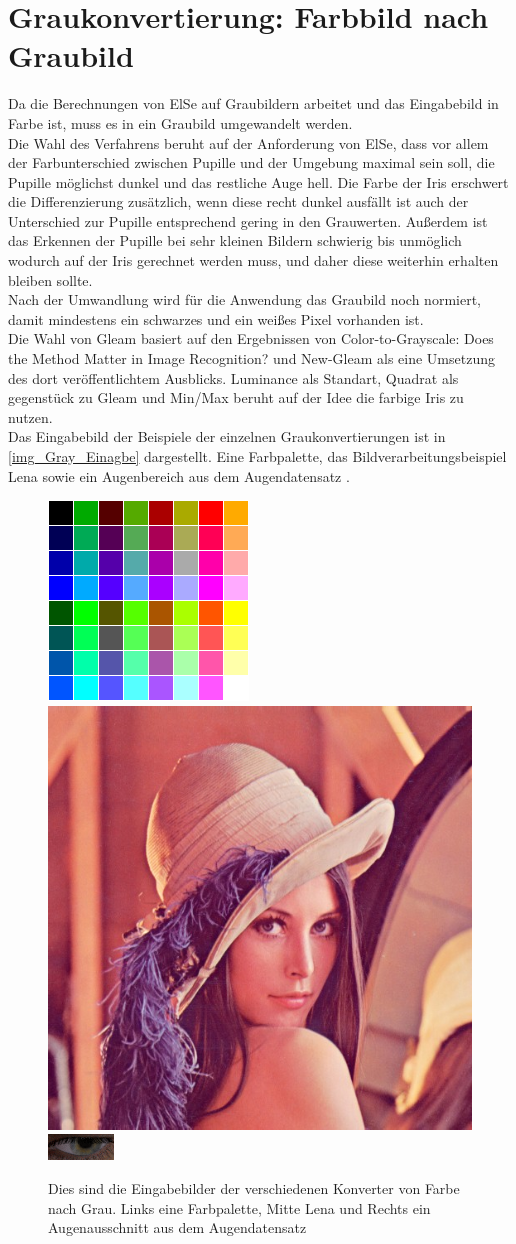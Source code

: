 \section{Graukonvertierung: Farbbild nach Graubild}
\label{Graubild}
Da die Berechnungen von ElSe auf Graubildern arbeitet und das Eingabebild in Farbe ist, muss es in ein Graubild umgewandelt werden.\\
Die Wahl des Verfahrens beruht auf der Anforderung von ElSe, dass vor allem der Farbunterschied zwischen Pupille und der Umgebung maximal sein soll, die Pupille möglichst dunkel und das restliche Auge hell. Die Farbe der Iris erschwert die Differenzierung zusätzlich, wenn diese recht dunkel ausfällt ist auch der Unterschied zur Pupille entsprechend gering in den Grauwerten. Außerdem ist das Erkennen der Pupille bei sehr kleinen Bildern schwierig bis unmöglich wodurch auf der Iris gerechnet werden muss, und daher diese weiterhin erhalten bleiben sollte.\\
Nach der Umwandlung wird für die Anwendung das Graubild noch normiert, damit mindestens ein schwarzes und ein weißes Pixel vorhanden ist.\\
Die Wahl von Gleam basiert auf den Ergebnissen von \glqq Color-to-Grayscale: Does the Method Matter in Image Recognition?\grqq \cite{rgb_to_Gray} und New-Gleam als eine Umsetzung des dort veröffentlichtem Ausblicks. Luminance als Standart, Quadrat als gegenstück zu Gleam und Min/Max beruht auf der Idee die farbige Iris zu nutzen.\\
Das Eingabebild der Beispiele der einzelnen Graukonvertierungen ist in \autoref{img_Gray_Einagbe} dargestellt. Eine Farbpalette, das Bildverarbeitungsbeispiel Lena sowie ein Augenbereich aus dem Augendatensatz \cite{database_Eye}. 
\begin{figure}
	\centering
	\includegraphics[width=0.19\linewidth]{img/Farbtafel2}
	\includegraphics[width=0.19\linewidth]{img/lena}
	\includegraphics[width=0.19\linewidth]{img/Auge}
	\caption{Dies sind die Eingabebilder der verschiedenen Konverter von Farbe nach Grau. Links eine Farbpalette, Mitte Lena und Rechts ein Augenausschnitt aus dem Augendatensatz \cite{database_Eye}}
	\label{img_Gray_Einagbe}
\end{figure}

